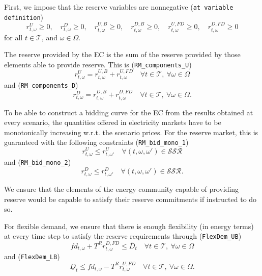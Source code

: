 \documentclass{article}
\begin{document}
First, we impose that the reserve variables are nonnegative (\verb|at variable definition|)
\begin{equation} \label{EQ:RVarDef}
    r^{U}_{t, \omega} \geq 0, \quad r^{D}_{t, \omega} \geq 0, \quad r^{U, B}_{t, \omega} \geq 0, \quad r^{D, B}_{t, \omega} \geq 0, \quad r^{U, FD}_{t, \omega} \geq 0, \quad r^{D, FD}_{t, \omega} \geq 0
\end{equation}
for all $t \in \mathcal{T}$, and $\omega \in \Omega$. 

The reserve provided by the EC is the sum of the reserve provided by those elements able to provide reserve. This is (\verb|RM_components_U|)
\begin{equation} \label{EQ:RUcomp}
    r^{U}_{t, \omega} = r^{U, B}_{t, \omega} +  r^{U, FD}_{t, \omega} \quad \forall t \in \mathcal{T}, \ \forall \omega \in \Omega
\end{equation}
and (\verb|RM_components_D|)
\begin{equation} \label{EQ:RDcomp}
	r^{D}_{t, \omega} = r^{D, B}_{t, \omega} +  r^{D, FD}_{t, \omega} \quad \forall t \in \mathcal{T}, \ \forall \omega \in \Omega.
\end{equation}

To be able to construct a bidding curve for the EC from the results obtained at every scenario, the quantities offered in electricity markets have to be monotonically increasing w.r.t. the scenario prices. For the reserve market, this is guaranteed with the following constraints (\verb|RM_bid_mono_1|)
\begin{equation} \label{EQ:RUmono}
	r^{U}_{t, \omega} \leq r^{U}_{t, \omega'} \quad \forall (t, \omega, \omega') \in \mathcal{SSR}
\end{equation}
and (\verb|RM_bid_mono_2|)
\begin{equation} \label{EQ:RDmono}
	r^{D}_{t, \omega} \leq r^{D}_{t, \omega'} \quad \forall (t, \omega, \omega') \in \mathcal{SSR}.
\end{equation}

We ensure that the elements of the energy community capable of providing reserve would be capable to satisfy their reserve commitments if instructed to do so. 

For flexible demand, we ensure that there is enough flexibility (in energy terms) at every time step to satisfy the reserve requirements through (\verb|FlexDem_UB|)
\begin{equation} \label{EQ:FlexDemand_UB}
	fd_{t, \omega} + T^R r^{D, FD}_{t, \omega} \leq \overline{D}_t \quad \forall t \in \mathcal{T}, \ \forall \omega \in \Omega
\end{equation}
and (\verb|FlexDem_LB|)
\begin{equation} \label{EQ:FlexDemand_LB}
	\underline{D}_t \leq fd_{t, \omega} - T^R r^{U, FD}_{t, \omega} \quad \forall t \in \mathcal{T}, \ \forall \omega \in \Omega.
\end{equation}
\end{document}
